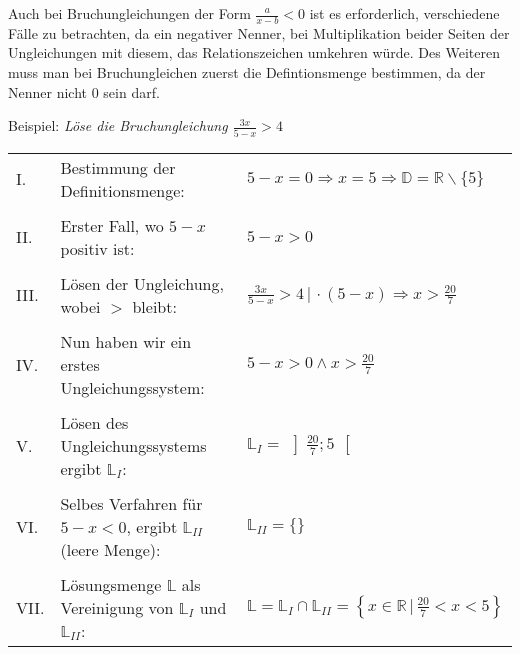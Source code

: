 
Auch bei Bruchungleichungen der Form $\frac{a}{x - b} < 0$ ist es erforderlich, verschiedene F\"{a}lle zu betrachten, da ein negativer Nenner, bei Multiplikation beider Seiten der Ungleichungen mit diesem, das Relationszeichen umkehren w\"{u}rde. Des Weiteren muss man bei Bruchungleichen zuerst die Defintionsmenge bestimmen, da der Nenner nicht 0 sein darf.

Beispiel: \emph{L\"{o}se die Bruchungleichung $\frac{3x}{5 - x} > 4$}

\begin{table}[h!]
	\begin{tabular}{p{0.3cm} p{8.5cm} l}
		I. & Bestimmung der Definitionsmenge: & $5 - x = 0 \Rightarrow x = 5 \Rightarrow \mathbb{D} = \mathbb{R} \backslash \{5\}$
		\\ && \\
		II. & Erster Fall, wo $5 - x$ positiv ist: & $5 - x > 0$
		\\ && \\
		III. & L\"{o}sen der Ungleichung, wobei $>$ bleibt: & $\frac{3x}{5 - x} > 4 \,|\, \cdot (5 - x) \Rightarrow x > \frac{20}{7}$
		\\ && \\
		IV. & Nun haben wir ein erstes Ungleichungssystem: & $5 - x > 0 \land x > \frac{20}{7}$
		\\ && \\
		V. & L\"{o}sen des Ungleichungssystems ergibt $\mathbb{L}_{I}$: & $\mathbb{L}_{I} = \,\left]\frac{20}{7};5\,\right[$
		\\ && \\
		VI. & Selbes Verfahren f\"{u}r $5 - x < 0$, ergibt $\mathbb{L}_{II}$ (leere Menge): & $\mathbb{L}_{II} = \{ \}$
		\\ && \\
		VII. & L\"{o}sungsmenge $\mathbb{L}$ als Vereinigung von $\mathbb{L}_{I}$ und $\mathbb{L}_{II}$: & $\mathbb{L} = \mathbb{L}_I \cap \mathbb{L}_{II} = \left\{x \in \mathbb{R} \,|\, \frac{20}{7} < x < 5 \right\}$
	\end{tabular}
\end{table}

